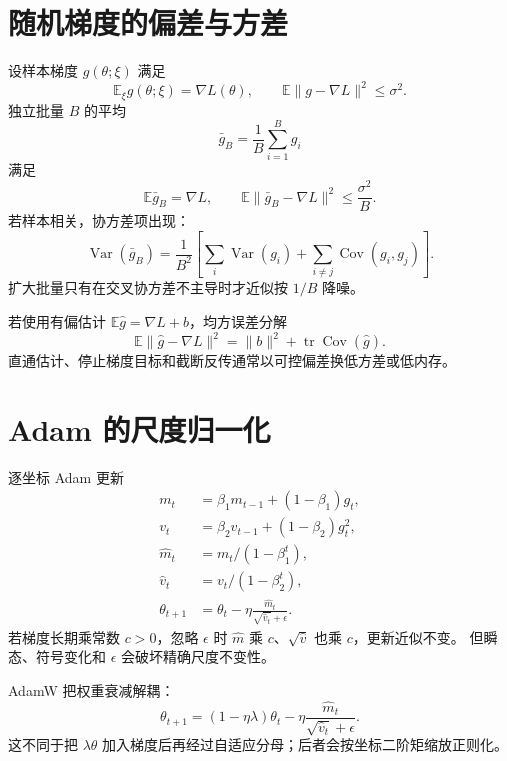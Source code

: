 \documentclass[11pt]{article}
\numberwithin{equation}{section}
\newcommand{\E}{\mathbb{E}}
\newcommand{\1}{\mathbf{1}}
\newcommand{\tr}{\operatorname{tr}}
\newcommand{\Var}{\operatorname{Var}}
\newcommand{\Cov}{\operatorname{Cov}}
\begin{document}
\section{随机梯度的偏差与方差}

设样本梯度 $g(\theta;\xi)$ 满足
\begin{equation}
 \E_\xi g(\theta;\xi)=\nabla L(\theta),
 \qquad \E\|g-\nabla L\|^2\le\sigma^2.
\end{equation}
独立批量 $B$ 的平均
\begin{equation}
 \bar g_B=\frac1B\sum_{i=1}^{B}g_i
\end{equation}
满足
\begin{equation}
 \E\bar g_B=\nabla L,\qquad
 \E\|\bar g_B-\nabla L\|^2\le\frac{\sigma^2}{B}.
\end{equation}
若样本相关，协方差项出现：
\begin{equation}
 \Var(\bar g_B)=\frac1{B^2}\left[
 \sum_i\Var(g_i)+\sum_{i\ne j}\Cov(g_i,g_j)
 \right].
\end{equation}
扩大批量只有在交叉协方差不主导时才近似按 $1/B$ 降噪。

若使用有偏估计 $\E\widehat g=\nabla L+b$，均方误差分解
\begin{equation}
 \E\|\widehat g-\nabla L\|^2
 =\|b\|^2+\tr\Cov(\widehat g).
\end{equation}
直通估计、停止梯度目标和截断反传通常以可控偏差换低方差或低内存。

\section{Adam 的尺度归一化}

逐坐标 Adam 更新
\begin{align}
 m_t&=\beta_1m_{t-1}+(1-\beta_1)g_t,\\
 v_t&=\beta_2v_{t-1}+(1-\beta_2)g_t^2,\\
 \widehat m_t&=m_t/(1-\beta_1^t),\\
 \widehat v_t&=v_t/(1-\beta_2^t),\\
 \theta_{t+1}&=\theta_t-\eta
 \frac{\widehat m_t}{\sqrt{\widehat v_t}+\epsilon}.
\end{align}
若梯度长期乘常数 $c>0$，忽略 $\epsilon$ 时
$\widehat m$ 乘 $c$、$\sqrt{\widehat v}$ 也乘 $c$，更新近似不变。
但瞬态、符号变化和 $\epsilon$ 会破坏精确尺度不变性。

AdamW 把权重衰减解耦：
\begin{equation}
 \theta_{t+1}=(1-\eta\lambda)\theta_t
 -\eta\frac{\widehat m_t}{\sqrt{\widehat v_t}+\epsilon}.
\end{equation}
这不同于把 $\lambda\theta$ 加入梯度后再经过自适应分母；后者会按坐标二阶矩缩放正则化。
\end{document}
